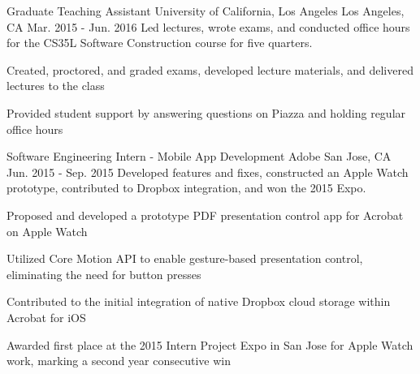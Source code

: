 
%
% 
% 
%
%
%
%
%
% 

\begin{cventries}

\cventry
    {Graduate Teaching Assistant} %
    {University of California, Los Angeles} %
    {Los Angeles, CA} %
    {Mar. 2015 - Jun. 2016} %
    {Led lectures, wrote exams, and conducted office hours for the CS35L Software Construction course for five quarters.} %
    {
      \begin{cvitems} %
        \item {Created, proctored, and graded exams, developed lecture materials, and delivered lectures to the class}
        \item {Provided student support by answering questions on Piazza and holding regular office hours}
      \end{cvitems}
    }

\cventry
    {Software Engineering Intern - Mobile App Development} %
    {Adobe} %
    {San Jose, CA} %
    {Jun. 2015 - Sep. 2015} %
    {Developed features and fixes, constructed an Apple Watch prototype, contributed to Dropbox integration, and won the 2015 Expo.} %
    {
      \begin{cvitems} %
        \item {Proposed and developed a prototype PDF presentation control app for Acrobat on Apple Watch}
        \item {Utilized Core Motion API to enable gesture-based presentation control, eliminating the need for button presses}
        \item {Contributed to the initial integration of native Dropbox cloud storage within Acrobat for iOS}
        \item {Awarded first place at the 2015 Intern Project Expo in San Jose for Apple Watch work, marking a second year consecutive win}
      \end{cvitems}
    }


\end{cventries}
